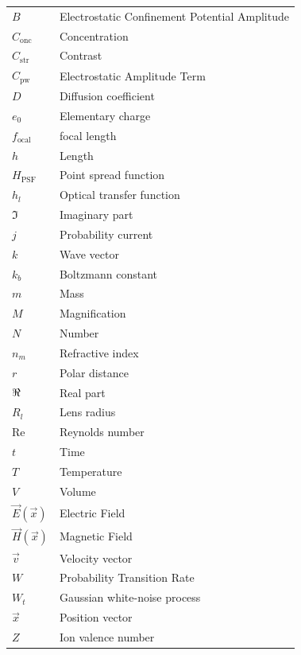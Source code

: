 \documentclass[12pt, oneside]{book}
\newcommand{\real}{\Re}
\renewcommand{\Re}{\mathchar"023C}
\begin{document}
\begin{longtable}{@{} p{} @{\hspace{1em}} p{} @{}}
    $B$                  & Electrostatic Confinement Potential Amplitude\\
    $C_\mathrm{onc}$     & Concentration \\
    $C_\mathrm{str}$     & Contrast \\
    $C_\mathrm{pw}$      & Electrostatic Amplitude Term \\
    $D$                  & Diffusion coefficient \\
    $e_0$                & Elementary charge \\
    $f_\mathrm{ocal}$    & focal length\\
    $h$                  & Length \\
    $H_\mathrm{PSF}$     & Point spread function \\
    $h_l$                & Optical transfer function \\
    $\Im$                & Imaginary part \\
    $j$                  & Probability current \\
    $k$                  & Wave vector \\
    $k_b$                & Boltzmann constant \\
    $m$                  & Mass \\
    $M$                  & Magnification \\
    $N$                  & Number \\
    $n_m$                & Refractive index\\
    $r$                  & Polar distance\\
    $\real$                & Real part \\
    $R_l$                & Lens radius \\
    $\mathrm{Re}$        & Reynolds number \\
    $t$                  & Time \\
    $T$                  & Temperature \\
    $V$                  & Volume \\
    $\vec{E}(\vec{x})$   & Electric Field\\
    $\vec{H}(\vec{x})$   & Magnetic Field \\
    $\vec{v}$            & Velocity vector \\
    $W$                  & Probability Transition Rate \\
    $W_t$                & Gaussian white-noise process \\
    $\vec{x}$            & Position vector \\
    $Z$                  & Ion valence number  \\


\end{longtable}
\end{document}
